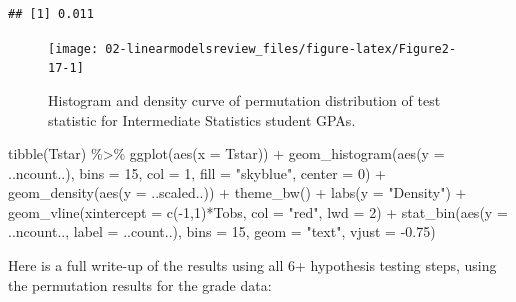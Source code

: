 \documentclass[
]{book}
\newenvironment{Shaded}{\begin{snugshade}}{\end{snugshade}}
\newcommand{\AttributeTok}[1]{\textcolor[rgb]{0.77,0.63,0.00}{#1}}
\newcommand{\DecValTok}[1]{\textcolor[rgb]{0.00,0.00,0.81}{#1}}
\newcommand{\FloatTok}[1]{\textcolor[rgb]{0.00,0.00,0.81}{#1}}
\newcommand{\FunctionTok}[1]{\textcolor[rgb]{0.00,0.00,0.00}{#1}}
\newcommand{\NormalTok}[1]{#1}
\newcommand{\SpecialCharTok}[1]{\textcolor[rgb]{0.00,0.00,0.00}{#1}}
\newcommand{\StringTok}[1]{\textcolor[rgb]{0.31,0.60,0.02}{#1}}
\begin{document}
\begin{verbatim}
## [1] 0.011
\end{verbatim}



\begin{figure}[ht!]

{\centering \texttt{[image: 02-linearmodelsreview\_files/figure-latex/Figure2-17-1]} 

}

\caption{Histogram and density curve of permutation distribution of test statistic for Intermediate Statistics student GPAs.}\label{fig:Figure2-17}
\end{figure}

\begin{Shaded}
\begin{Highlighting}[]
\FunctionTok{tibble}\NormalTok{(Tstar) }\SpecialCharTok{\%\textgreater{}\%} \FunctionTok{ggplot}\NormalTok{(}\FunctionTok{aes}\NormalTok{(}\AttributeTok{x =}\NormalTok{ Tstar)) }\SpecialCharTok{+} 
  \FunctionTok{geom\_histogram}\NormalTok{(}\FunctionTok{aes}\NormalTok{(}\AttributeTok{y =}\NormalTok{ ..ncount..), }\AttributeTok{bins =} \DecValTok{15}\NormalTok{, }\AttributeTok{col =} \DecValTok{1}\NormalTok{, }\AttributeTok{fill =} \StringTok{"skyblue"}\NormalTok{, }\AttributeTok{center =} \DecValTok{0}\NormalTok{) }\SpecialCharTok{+} 
  \FunctionTok{geom\_density}\NormalTok{(}\FunctionTok{aes}\NormalTok{(}\AttributeTok{y =}\NormalTok{ ..scaled..)) }\SpecialCharTok{+}
  \FunctionTok{theme\_bw}\NormalTok{() }\SpecialCharTok{+}
  \FunctionTok{labs}\NormalTok{(}\AttributeTok{y =} \StringTok{"Density"}\NormalTok{) }\SpecialCharTok{+}
  \FunctionTok{geom\_vline}\NormalTok{(}\AttributeTok{xintercept =} \FunctionTok{c}\NormalTok{(}\SpecialCharTok{{-}}\DecValTok{1}\NormalTok{,}\DecValTok{1}\NormalTok{)}\SpecialCharTok{*}\NormalTok{Tobs, }\AttributeTok{col =} \StringTok{"red"}\NormalTok{, }\AttributeTok{lwd =} \DecValTok{2}\NormalTok{) }\SpecialCharTok{+}
  \FunctionTok{stat\_bin}\NormalTok{(}\FunctionTok{aes}\NormalTok{(}\AttributeTok{y =}\NormalTok{ ..ncount.., }\AttributeTok{label =}\NormalTok{ ..count..), }\AttributeTok{bins =} \DecValTok{15}\NormalTok{, }
           \AttributeTok{geom =} \StringTok{"text"}\NormalTok{, }\AttributeTok{vjust =} \SpecialCharTok{{-}}\FloatTok{0.75}\NormalTok{)}
\end{Highlighting}
\end{Shaded}

Here is a full write-up of the results using all 6+ hypothesis testing
steps,
using the permutation  results for the grade data:
\end{document}
